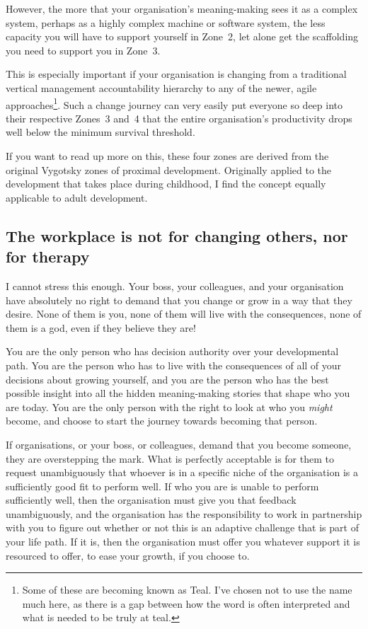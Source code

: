 However, the more that your organisation's meaning\hyp{}making sees it as a complex system, perhaps as a highly complex machine or software system, the less capacity you will have to support yourself in Zone~2, let alone get the scaffolding  you need to support you in Zone~3.


This is especially important if your organisation is changing from a traditional vertical management accountability hierarchy to any of the newer, agile approaches\footnote{Some of these are becoming known as Teal.  I’ve chosen not to use the name much here, as there is a gap between how the word is often interpreted and what is needed to be truly at teal.}. Such a change journey can very easily put everyone so deep into their respective Zones~3 and~4 that the entire organisation’s productivity drops well below the minimum survival threshold.


If you want to read up more on this, these four zones are derived from the original Vygotsky zones of proximal development\cite{vygotsky-thought, vygotsky-mind}. Originally applied to the development that takes place during childhood, I find the concept equally applicable to adult development.
\subsection{The workplace is not for changing others, nor for therapy}
I cannot stress this enough. Your boss, your colleagues, and your organisation have absolutely no right to demand that you change or grow in a way that they desire. None of them is you, none of them will live with the consequences, none of them is a god, even if they believe they are!


You are the only person who has decision authority over your developmental path. You are the person who has to live with the consequences of all of your decisions about growing yourself, and you are the person who has the best possible insight into all the hidden meaning\hyp{}making stories  that shape who you are today. You are the only person with the right to look at who you \emph{might} become, and choose to start the journey towards becoming that person.


If organisations, or your boss, or colleagues, demand that you become someone, they are overstepping the mark. What is perfectly acceptable is for them to request unambiguously that whoever is in a specific niche of the organisation is a sufficiently good fit to perform well. If who you are is unable to perform sufficiently well, then the organisation must give you that feedback unambiguously, and the organisation has the responsibility to work in partnership with you to figure out whether or not this is an adaptive challenge that is part of your life path. If it is, then the organisation must offer you whatever support it is resourced to offer, to ease your growth, if you choose to.


